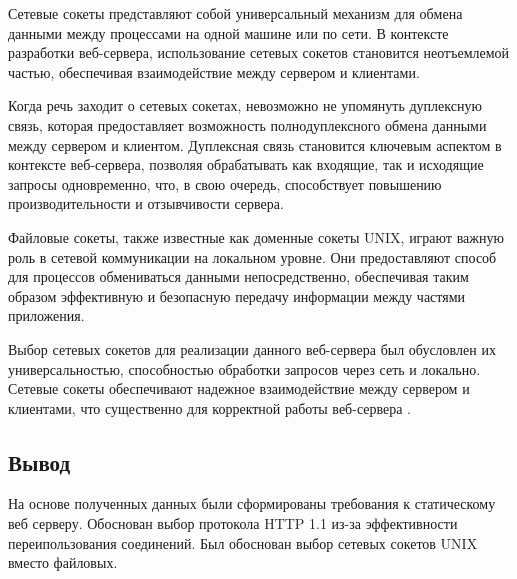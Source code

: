 Сетевые сокеты представляют собой универсальный механизм для обмена данными между процессами на одной машине или по сети. В контексте разработки веб-сервера, использование сетевых сокетов становится неотъемлемой частью, обеспечивая взаимодействие между сервером и клиентами.

Когда речь заходит о сетевых сокетах, невозможно не упомянуть дуплексную связь, которая предоставляет возможность полнодуплексного обмена данными между сервером и клиентом. Дуплексная связь становится ключевым аспектом в контексте веб-сервера, позволяя обрабатывать как входящие, так и исходящие запросы одновременно, что, в свою очередь, способствует повышению производительности и отзывчивости сервера.

Файловые сокеты, также известные как доменные сокеты UNIX, играют важную роль в сетевой коммуникации на локальном уровне. Они предоставляют способ для процессов обмениваться данными непосредственно, обеспечивая таким образом эффективную и безопасную передачу информации между частями приложения.

Выбор сетевых сокетов для реализации данного веб-сервера был обусловлен их универсальностью, способностью обработки запросов через сеть и локально. Сетевые сокеты обеспечивают надежное взаимодействие между сервером и клиентами, что существенно для корректной работы веб-сервера \cite{nets1}.

\subsection{Вывод}
На основе полученных данных были сформированы требования к статическому веб серверу. Обоснован выбор протокола HTTP 1.1 из-за эффективности переипользования соединений. Был обоснован выбор сетевых сокетов UNIX вместо файловых.